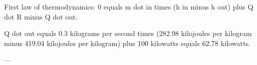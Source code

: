 First law of thermodynamics:  
0 equals m dot in times (h in minus h out) plus Q dot R minus Q dot out.  

Q dot out equals 0.3 kilograms per second times (282.98 kilojoules per kilogram minus 419.04 kilojoules per kilogram) plus 100 kilowatts equals 62.78 kilowatts.  

---